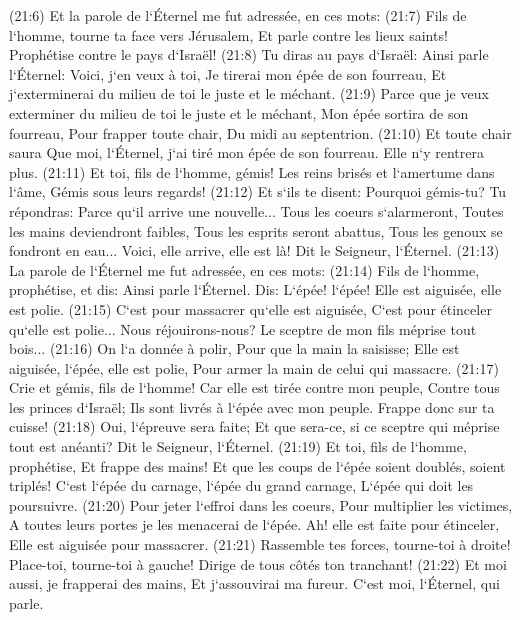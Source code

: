 \verse (21:6) Et la parole de l`Éternel me fut adressée, en ces mots: 
\verse (21:7) Fils de l`homme, tourne ta face vers Jérusalem, Et parle contre les lieux saints! Prophétise contre le pays d`Israël! 
\verse (21:8) Tu diras au pays d`Israël: Ainsi parle l`Éternel: Voici, j`en veux à toi, Je tirerai mon épée de son fourreau, Et j`exterminerai du milieu de toi le juste et le méchant. 
\verse (21:9) Parce que je veux exterminer du milieu de toi le juste et le méchant, Mon épée sortira de son fourreau, Pour frapper toute chair, Du midi au septentrion. 
\verse (21:10) Et toute chair saura Que moi, l`Éternel, j`ai tiré mon épée de son fourreau. Elle n`y rentrera plus. 
\verse (21:11) Et toi, fils de l`homme, gémis! Les reins brisés et l`amertume dans l`âme, Gémis sous leurs regards! 
\verse (21:12) Et s`ils te disent: Pourquoi gémis-tu? Tu répondras: Parce qu`il arrive une nouvelle... Tous les coeurs s`alarmeront, Toutes les mains deviendront faibles, Tous les esprits seront abattus, Tous les genoux se fondront en eau... Voici, elle arrive, elle est là! Dit le Seigneur, l`Éternel. 
\verse (21:13) La parole de l`Éternel me fut adressée, en ces mots: 
\verse (21:14) Fils de l`homme, prophétise, et dis: Ainsi parle l`Éternel. Dis: L`épée! l`épée! Elle est aiguisée, elle est polie. 
\verse (21:15) C`est pour massacrer qu`elle est aiguisée, C`est pour étinceler qu`elle est polie... Nous réjouirons-nous? Le sceptre de mon fils méprise tout bois... 
\verse (21:16) On l`a donnée à polir, Pour que la main la saisisse; Elle est aiguisée, l`épée, elle est polie, Pour armer la main de celui qui massacre. 
\verse (21:17) Crie et gémis, fils de l`homme! Car elle est tirée contre mon peuple, Contre tous les princes d`Israël; Ils sont livrés à l`épée avec mon peuple. Frappe donc sur ta cuisse! 
\verse (21:18) Oui, l`épreuve sera faite; Et que sera-ce, si ce sceptre qui méprise tout est anéanti? Dit le Seigneur, l`Éternel. 
\verse (21:19) Et toi, fils de l`homme, prophétise, Et frappe des mains! Et que les coups de l`épée soient doublés, soient triplés! C`est l`épée du carnage, l`épée du grand carnage, L`épée qui doit les poursuivre. 
\verse (21:20) Pour jeter l`effroi dans les coeurs, Pour multiplier les victimes, A toutes leurs portes je les menacerai de l`épée. Ah! elle est faite pour étinceler, Elle est aiguisée pour massacrer. 
\verse (21:21) Rassemble tes forces, tourne-toi à droite! Place-toi, tourne-toi à gauche! Dirige de tous côtés ton tranchant! 
\verse (21:22) Et moi aussi, je frapperai des mains, Et j`assouvirai ma fureur. C`est moi, l`Éternel, qui parle. 

